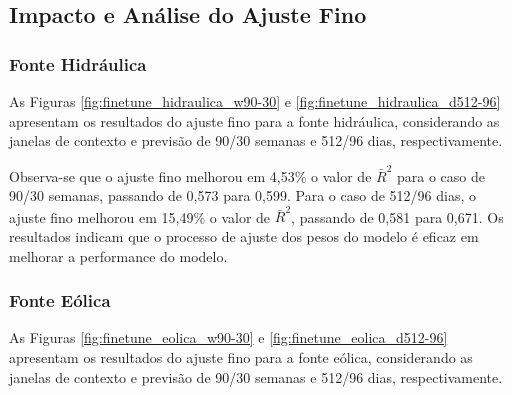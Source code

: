 \subsection{Impacto e Análise do Ajuste Fino}
\subsubsection{Fonte Hidráulica}
\begin{figure}[!ht]
  {}
  {}
\end{figure}
\begin{figure}[!ht]
  {}
  {}
\end{figure}
As Figuras \ref{fig:finetune_hidraulica_w90-30} e \ref{fig:finetune_hidraulica_d512-96} apresentam os resultados do ajuste fino
para a fonte hidráulica, considerando as janelas de contexto e previsão de 90/30 semanas e 512/96 dias, respectivamente.

Observa-se que o ajuste fino melhorou em 4,53\% o valor de $\bar{R}^2$ para o caso de 90/30 semanas, passando de 0,573 para 0,599.
Para o caso de 512/96 dias, o ajuste fino melhorou em 15,49\% o valor de $\bar{R}^2$, passando de 0,581 para 0,671. Os resultados 
indicam que o processo de ajuste dos pesos do modelo é eficaz em melhorar a performance do modelo.

\subsubsection{Fonte Eólica}
\begin{figure}[!ht]
  {}
  {}
\end{figure}
\begin{figure}[!ht]
  {}
  {}
\end{figure}
As Figuras \ref{fig:finetune_eolica_w90-30} e \ref{fig:finetune_eolica_d512-96} apresentam os resultados do ajuste fino
para a fonte eólica, considerando as janelas de contexto e previsão de 90/30 semanas e 512/96 dias, respectivamente.

